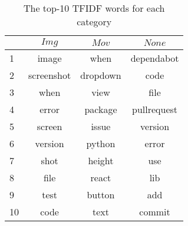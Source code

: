 \begin{table}[t]
  \begin{center}
  \caption{The top-10 TFIDF words for each category}
  \begin{tabular}{l | c c c }
    \toprule
    & $Img$ & $Mov$ & $None$\\
    \midrule
    1 & image & when & dependabot\\
    2 & screenshot & dropdown & code\\
    3 & when & view & file\\
    4 & error & package & pullrequest\\
    5 & screen & issue & version\\
    6 & version & python & error\\
    7 & shot & height & use\\
    8 & file & react & lib\\
    9 & test & button & add\\
    10& code & text & commit\\
    \bottomrule
  \end{tabular}\\
  \label{tf-idf_result}
  \end{center}
\end{table}
